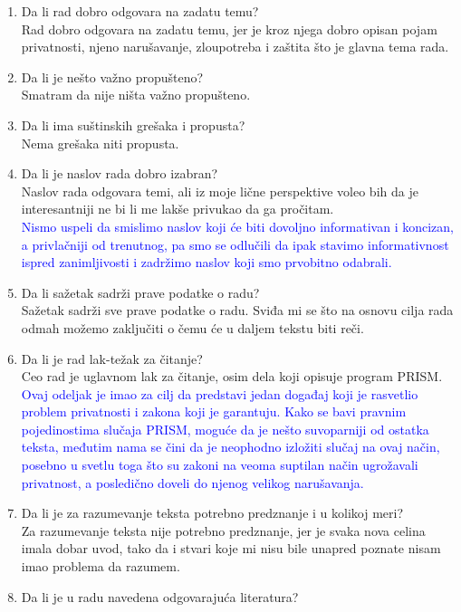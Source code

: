 \documentclass[a4paper]{report}
\newcommand{\odgovor}[1]{\textcolor{blue}{#1}}
\begin{document}
\begin{enumerate}
\item Da li rad dobro odgovara na zadatu temu?\\
Rad dobro odgovara na zadatu temu, jer je kroz njega dobro opisan pojam privatnosti, njeno narušavanje, zloupotreba i zaštita što je glavna tema rada.   
\item Da li je nešto važno propušteno?\\
Smatram da nije ništa važno propušteno.
\item Da li ima suštinskih grešaka i propusta?\\
Nema grešaka niti propusta.
\item Da li je naslov rada dobro izabran?\\
Naslov rada odgovara temi, ali iz moje lične perspektive voleo bih da je interesantniji ne bi li me lakše privukao da ga pročitam.
\\
\odgovor{Nismo uspeli da smislimo naslov koji će biti dovoljno informativan i koncizan, a privlačniji od trenutnog, pa smo se odlučili da ipak stavimo informativnost ispred zanimljivosti i zadržimo naslov koji smo prvobitno odabrali.}
\item Da li sažetak sadrži prave podatke o radu?\\
Sažetak sadrži sve prave podatke o radu. Sviđa mi se što na osnovu cilja rada odmah možemo zaključiti o čemu će u daljem tekstu biti reči. 
\item Da li je rad lak-težak za čitanje?\\
Ceo rad je uglavnom lak za čitanje, osim dela koji opisuje program PRISM.
\\
\odgovor{Ovaj odeljak je imao za cilj da predstavi jedan događaj koji je rasvetlio problem privatnosti i zakona koji je garantuju. Kako se bavi pravnim pojedinostima slučaja PRISM, moguće da je nešto suvoparniji od ostatka teksta, međutim nama se čini da je neophodno izložiti slučaj na ovaj način, posebno u svetlu toga što su zakoni na veoma suptilan način ugrožavali privatnost, a posledično doveli do njenog velikog narušavanja.} 
\item Da li je za razumevanje teksta potrebno predznanje i u kolikoj meri?\\
Za razumevanje teksta nije potrebno predznanje, jer je svaka nova celina imala dobar uvod, tako da i stvari koje mi nisu bile unapred poznate nisam imao problema da razumem.
\item Da li je u radu navedena odgovarajuća literatura?\\

\end{enumerate}
\end{document}
